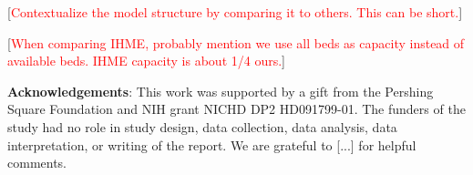 \documentclass[11pt]{article}
\newcommand{\comments}[1]{[\textcolor{red}{#1}]}
\begin{document}
\comments{Contextualize the model structure by comparing it to others. This can be short.} 

\comments{When comparing IHME, probably mention we use all beds as capacity instead of available beds. IHME capacity is about 1/4 ours.}


\noindent \textbf{Acknowledgements}:
This work was supported by a gift from the Pershing Square Foundation and NIH grant NICHD DP2 HD091799-01. The funders of the study had no role in study design, data collection, data analysis, data interpretation, or writing of the report.  We are grateful to [...]
for helpful comments.







\end{document}
